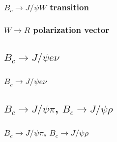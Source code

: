 \documentclass{beamer}
\begin{document}
\begin{frame}
  \frametitle{$B_c \to J/\psi W$ transition}
\end{frame}

\begin{frame}
  \frametitle{$W\to R$ polarization vector}
\end{frame}

\subsection{$B_c\to J/\psi e\nu$}
\begin{frame}
  \frametitle{$B_c\to J/\psi e\nu$}
\end{frame}

\subsection{$B_c\to J/\psi \pi$, $B_c\to J/\psi \rho$}
\begin{frame}
  \frametitle{$B_c\to J/\psi \pi$, $B_c\to J/\psi \rho$}
\end{frame}
\end{document}
